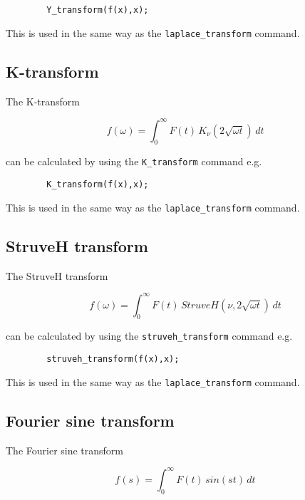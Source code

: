 \begin{verbatim}
        Y_transform(f(x),x);    
\end{verbatim}

This is used in the same way as the \verb+laplace_transform+ command.

\subsection{K-transform}

The K-transform

\begin{displaymath}
f(\omega) = \int_{0}^{\infty} F(t) \,K_{\nu}(2\sqrt{\omega t}) \,dt
\end{displaymath}

can be calculated by using the \verb+K_transform+ command e.g.

\begin{verbatim}
        K_transform(f(x),x);    
\end{verbatim}

This is used in the same way as the \verb+laplace_transform+ command.

\subsection{StruveH transform}

The StruveH transform

\begin{displaymath}
f(\omega) = \int_{0}^{\infty} F(t) \,StruveH(\nu,2\sqrt{\omega t}) \,dt
\end{displaymath}

can be calculated by using the \verb+struveh_transform+ command e.g.

\begin{verbatim}
        struveh_transform(f(x),x);
\end{verbatim}

This is used in the same way as the \verb+laplace_transform+ command.

\subsection{Fourier sine transform}

The Fourier sine transform 

\begin{displaymath}
f(s) = \int_{0}^{\infty} F(t) \,sin (st) \,dt 
\end{displaymath}

